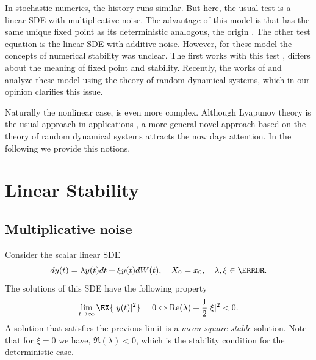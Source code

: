 		In stochastic numerics, the history runs similar. But here, the usual test is a linear SDE with 
	multiplicative noise. The advantage of this model is that has the same unique fixed point as its deterministic 
	analogous, the origin \cite[]{Higham2000} . The other test equation is the linear SDE with additive noise. However, 
	for these model the 
	concepts of numerical stability was unclear. The first works with this test 
	\cite{Hernandez1992,Milstein2004,Artemiev1997}, differs about the meaning of fixed point and stability. Recently, 
	the works of \citeauthor*{CruzCancino2010}
	\cite{CruzCancino2010} and \citeauthor*{Buckwar2011a} \cite{Buckwar2011a} analyze these model using the theory of
	random dynamical systems, which in our opinion clarifies this issue.
	
		Naturally the nonlinear case, is even more complex. Although  Lyapunov theory is the usual approach in 
	applications \cite{Khasminskii2011}, a more general novel approach based on the theory of random dynamical 
	systems \cite{Arnold1998} attracts the now days attention. In the following we provide this notions. 
		
\section*{Linear Stability}
	\subsection*{Multiplicative noise}
		Consider the scalar linear SDE
		\begin{equation}\label{eqn:SDEMultiplicativeNoise}
			dy(t)=\lambda y(t)dt+\xi y(t) dW(t) , \quad X_0=x_0,  \quad \lambda,\xi \in \C.
		\end{equation}
		The solutions of this SDE have the following property
		\begin{equation}\label{eqn:LinearMSEquivalence}
			\lim_{t\to\infty} \EX{|y(t)|^2} = 0 \Leftrightarrow \Re(\lambda) +\frac{1}{2} |\xi|^ 2 <0.
		\end{equation}
		A solution that satisfies  the previous limit  is a \emph{mean-square stable} solution. 
		Note that for $\xi = 0$ we have, $\Re(\lambda)<0$, which is the stability condition  for the deterministic case.
			
